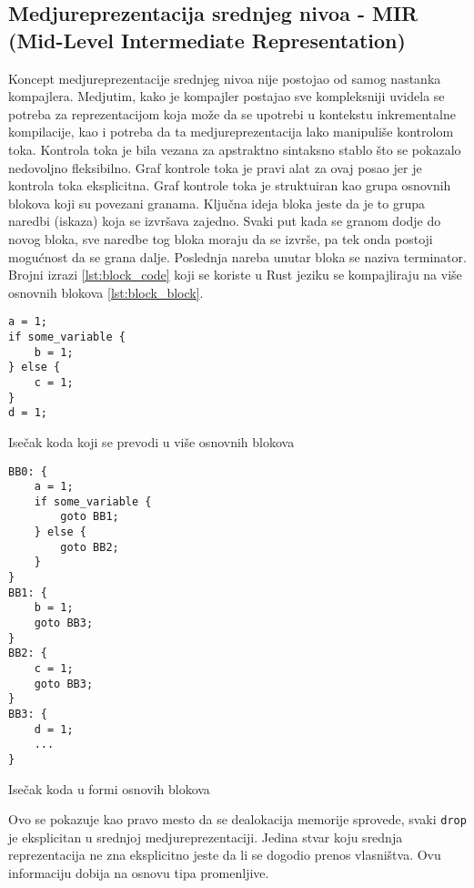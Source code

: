 \subsection{Medjureprezentacija srednjeg nivoa - MIR (Mid-Level Intermediate Representation)}

Koncept medjureprezentacije srednjeg nivoa nije postojao od samog nastanka kompajlera. Medjutim,
kako je kompajler postajao sve kompleksniji uvidela se potreba za reprezentacijom koja može da 
se upotrebi u kontekstu inkrementalne kompilacije, kao i potreba da ta medjureprezentacija lako manipuliše 
kontrolom toka. Kontrola toka je bila vezana za apstraktno sintaksno stablo što se pokazalo nedovoljno fleksibilno. 
Graf kontrole toka je pravi alat za ovaj posao jer je kontrola toka eksplicitna. Graf kontrole toka je 
struktuiran kao grupa osnovnih blokova koji su povezani granama. Ključna ideja bloka jeste da je to grupa naredbi (iskaza) 
koja se izvršava zajedno. Svaki put kada se granom dodje do novog bloka, sve naredbe tog bloka moraju da se izvrše, pa tek onda postoji mogućnost 
da se grana dalje. Poslednja nareba unutar bloka se naziva terminator. Brojni izrazi \ref{lst:block_code} koji se koriste u Rust jeziku se kompajliraju na 
više osnovnih blokova \ref{lst:block_block}.

\begin{listing}[H]
\begin{verbatim}
a = 1;
if some_variable {
    b = 1;
} else {
    c = 1;
}
d = 1;
\end{verbatim}
\caption{Isečak koda koji se prevodi u više osnovnih blokova}
\label{lst:block_code}
\end{listing}


\begin{listing}[H]
\begin{verbatim}
BB0: {
    a = 1;
    if some_variable {
        goto BB1;
    } else {
        goto BB2;
    }
}
BB1: {
    b = 1;
    goto BB3;
}
BB2: {
    c = 1;
    goto BB3;
}
BB3: {
    d = 1;
    ...
}
\end{verbatim}
\caption{Isečak koda u formi osnovih blokova}
\label{lst:block_block}
\end{listing}



Ovo se pokazuje kao pravo mesto da se 
dealokacija memorije sprovede, svaki \verb|drop| je eksplicitan u srednjoj medjureprezentaciji. Jedina stvar koju 
srednja reprezentacija ne zna eksplicitno jeste da li se dogodio prenos vlasništva. Ovu informaciju dobija na osnovu 
tipa promenljive.


